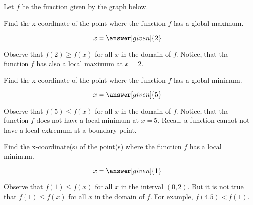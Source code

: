 \documentclass{ximera}
\begin{document}
  Let $f$ be the function given by the graph below. 
  \begin{image}
\end{image}
\begin{question}
  Find the x-coordinate of the point where the function $f$ has a global maximum.
    \begin{prompt}
  \[
 x= \answer[given]{2}
  \]
  \end{prompt}
 
 Observe that $f(2)\ge f(x)$ for all $x$ in the domain of $f$. Notice, that the function $f$  has also a local maximum at $x=2$. 
 
 \begin{question}
  Find the x-coordinate of the point where the function $f$ has a global minimum.
    \begin{prompt}
  \[
 x= \answer[given]{5}
  \]
  \end{prompt}
 Observe that $f(5)\le f(x)$ for all $x$ in the domain of $f$. Notice, that the function $f$  does not have a local minimum at $x=5$. 
 Recall, a function cannot not have a local extremum  at a boundary point.
\end{question}
\begin{question}
  Find the x-coordinate(s) of the point(s) where the function $f$ has a local minimum.
    \begin{prompt}
  \[
 x= \answer[given]{1}
  \]
  \end{prompt}
 Observe that $f(1)\le f(x)$ for all $x$ in the interval $(0,2)$. But it is not true that $f(1)\le f(x)$ for all $x$ in the domain of $f$. For example, $f(4.5)<f(1)$.
\end{question}
\end{question}
\end{document}
